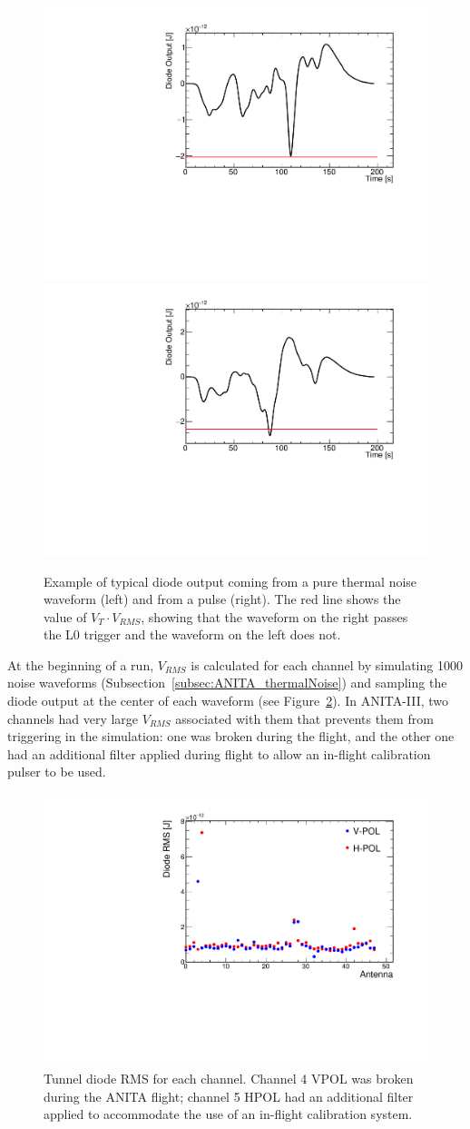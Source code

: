 \begin{figure}[!h]\centering
  \includegraphics[width=.45\linewidth]{./Figs/ExampleDiodeOutput_NOpass.pdf}
  \includegraphics[width=.45\linewidth]{./Figs/ExampleDiodeOutput_pass.pdf}
  \caption{Example of typical diode output coming from a pure thermal
    noise waveform (left) and from a pulse (right). The red
    line shows the value of $V_T \cdot V_{RMS}$, showing that the
    waveform on the right passes the L0 trigger and the waveform on
    the left does not.}
  \label{fig:ANITA_diodeOutput}
\end{figure}

At the beginning of a run, $V_{RMS}$ is calculated for each channel 
by simulating 1000 noise waveforms
(Subsection~\ref{subsec:ANITA_thermalNoise}) 
and sampling the diode output at the center of each waveform
(see Figure~\ref{fig:ANITA_diodeRMS}).
In ANITA-III, two channels had very large $V_{RMS}$ associated with them that prevents them from triggering in the simulation: one was broken during the flight, and the other one had an additional filter applied during flight to
allow an in-flight calibration pulser to be used.

\begin{figure}[!h]\centering
  \includegraphics[width=.45\linewidth]{./Figs/DiodeRMSfromFile.pdf}
  \caption{Tunnel diode RMS for each channel. Channel 4 VPOL was broken during the ANITA flight; channel 5 HPOL had an additional filter applied to accommodate the use of an in-flight calibration system.}
  \label{fig:ANITA_diodeRMS}
\end{figure}
 
